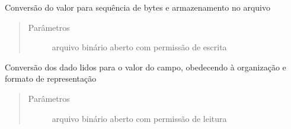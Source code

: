 \documentclass[letterpaper,10pt,brazil]{sphinxmanual}
\begin{document}
\begin{fulllineitems}

\begin{fulllineitems}
\label{\detokenize{estrutarq.campo:estrutarq.campo.campo_comum.CampoBasico.escreva}}
\pysigstartsignatures
{}
\pysigstopsignatures
\sphinxAtStartPar
Conversão do valor para sequência de bytes e armazenamento no
arquivo
\begin{quote}\begin{description}
\item[{Parâmetros}] \leavevmode
\sphinxAtStartPar
{} \textendash{} arquivo binário aberto com permissão de escrita

\end{description}\end{quote}

\end{fulllineitems}


\begin{fulllineitems}
\label{\detokenize{estrutarq.campo:estrutarq.campo.campo_comum.CampoBasico.leia}}
\pysigstartsignatures
{}
\pysigstopsignatures
\sphinxAtStartPar
Conversão dos dado lidos para o valor do campo, obedecendo à
organização e formato de representação
\begin{quote}\begin{description}
\item[{Parâmetros}] \leavevmode
\sphinxAtStartPar
{} \textendash{} arquivo binário aberto com permissão de leitura

\end{description}\end{quote}

\end{fulllineitems}


\end{fulllineitems}
\end{document}
